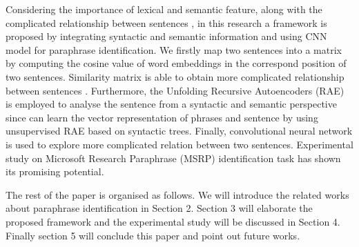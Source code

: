 \documentclass[conference]{IEEEtran}
\begin{document}
Considering the importance of lexical and semantic feature, along with the complicated relationship between sentences \cite{DBLP:conf/aaai/ShenRSOX15}, in this research a framework is proposed by integrating syntactic and semantic information and using CNN model for paraphrase identification. We firstly map two sentences into a matrix by computing the cosine value of word embeddings in the correspond position of two sentences. Similarity matrix is able to obtain more complicated relationship between sentences \cite{DBLP:conf/aaai/ShenRSOX15}. Furthermore, the Unfolding Recursive Autoencoders (RAE) \cite{DBLP:conf/nips/SocherHPNM11} is employed to analyse the sentence from a syntactic and semantic perspective since can learn the vector representation of phrases and sentence by using unsupervised RAE based on syntactic trees. Finally, convolutional neural network is used to explore more complicated relation between two sentences. Experimental study on Microsoft Research Paraphrase (MSRP) identification task has shown its promising potential.

The rest of the paper is organised as follows. We will introduce the related works about paraphrase identification in Section 2. Section 3 will elaborate the proposed framework and the experimental study will be discussed in Section 4. Finally section 5 will conclude this paper and point out future works.





\end{document}
